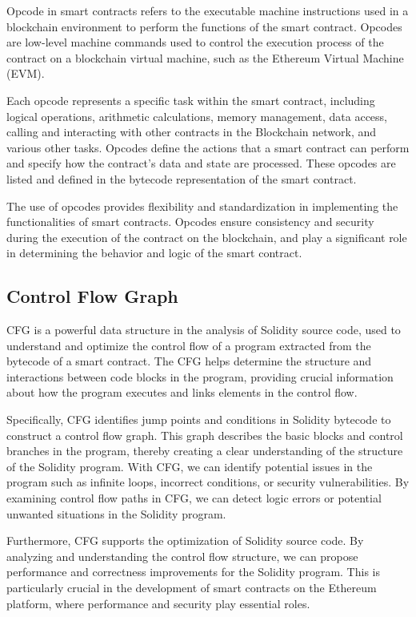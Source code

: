 Opcode in smart contracts refers to the executable machine instructions used in a blockchain environment to perform the functions of the smart contract. Opcodes are low-level machine commands used to control the execution process of the contract on a blockchain virtual machine, such as the Ethereum Virtual Machine (EVM).

Each opcode represents a specific task within the smart contract, including logical operations, arithmetic calculations, memory management, data access, calling and interacting with other contracts in the Blockchain network, and various other tasks. Opcodes define the actions that a smart contract can perform and specify how the contract's data and state are processed. These opcodes are listed and defined in the bytecode representation of the smart contract.

The use of opcodes provides flexibility and standardization in implementing the functionalities of smart contracts. Opcodes ensure consistency and security during the execution of the contract on the blockchain, and play a significant role in determining the behavior and logic of the smart contract.

\subsection{Control Flow Graph}

CFG is a powerful data structure in the analysis of Solidity source code, used to understand and optimize the control flow of a program extracted from the bytecode of a smart contract. The CFG helps determine the structure and interactions between code blocks in the program, providing crucial information about how the program executes and links elements in the control flow.

Specifically, CFG identifies jump points and conditions in Solidity bytecode to construct a control flow graph. This graph describes the basic blocks and control branches in the program, thereby creating a clear understanding of the structure of the Solidity program. With CFG, we can identify potential issues in the program such as infinite loops, incorrect conditions, or security vulnerabilities. By examining control flow paths in CFG, we can detect logic errors or potential unwanted situations in the Solidity program.

Furthermore, CFG supports the optimization of Solidity source code. By analyzing and understanding the control flow structure, we can propose performance and correctness improvements for the Solidity program. This is particularly crucial in the development of smart contracts on the Ethereum platform, where performance and security play essential roles.


